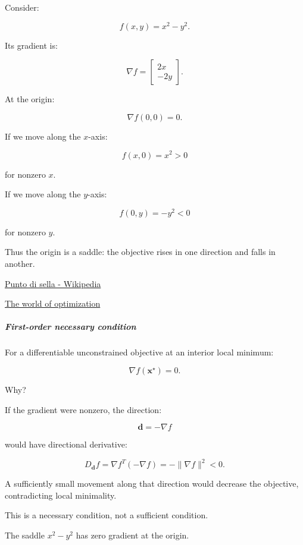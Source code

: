 Consider:

\[
f(x,y)=x^2-y^2.
\]

Its gradient is:

\[
\nabla f= \begin{bmatrix} 2x\\-2y \end{bmatrix}.
\]

At the origin:

\[
\nabla f(0,0)=0.
\]

If we move along the \(x\)-axis:

\[
f(x,0)=x^2>0
\]

for nonzero \(x\).

If we move along the \(y\)-axis:

\[
f(0,y)=-y^2<0
\]

for nonzero \(y\).

Thus the origin is a saddle: the objective rises in one direction and falls in another.

\href{https://images.openai.com/static-rsc-4/IqMqjdabbXp9lgF1Y59BWcBJuurZz0BV9d1Mv_AppeNOVYVoRQPuuV61Cf6TJAGqRi-DqMXoElE3-r5maVwHTXuo83A0mjM4FaBadvF4zNjF2LeOOzMjujVpT69hboVYADw65CSdRZt7hW_eNVx2xfRet5TkDNIoAwZTLnVQSgY?purpose=inline}{Punto di sella - Wikipedia}

\href{https://images.openai.com/static-rsc-4/2hdI6qSb-Gmq24hva1IPzdMch7SbSaYVsYlCAepKmsA3SZDPddxqa6DCww0y-FyOpM9G78ABWGxf3MsZs07Pfn1BlWk34xJqOTG0ScUe2i3GJrc8HXVjsf5kBDzuZpsfQjpbPkJbrEk2b-r1gAKcleVv-hPxqzAz9Qwbl9J2BsI?purpose=inline}{The world of optimization}

\subparagraph{First-order necessary condition}\label{first-order-necessary-condition}

For a differentiable unconstrained objective at an interior local minimum:

\[
\boxed{\nabla f(\mathbf x^\star)=0}.
\]

Why?

If the gradient were nonzero, the direction:

\[
\mathbf d=-\nabla f
\]

would have directional derivative:

\[
D_{\mathbf d}f = \nabla f^T(-\nabla f) = -\|\nabla f\|^2<0.
\]

A sufficiently small movement along that direction would decrease the objective, contradicting local minimality.

This is a necessary condition, not a sufficient condition.

The saddle \(x^2-y^2\) has zero gradient at the origin.

